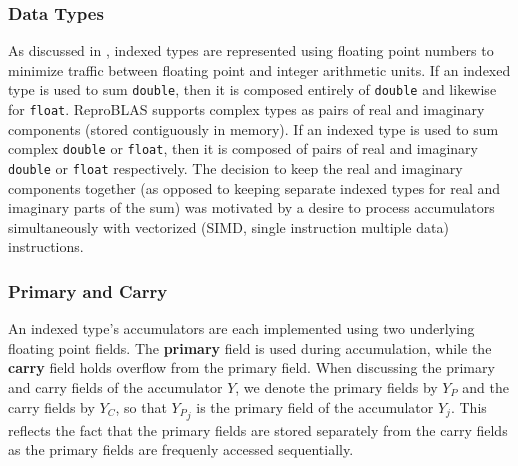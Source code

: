 \documentclass[12pt]{article}
\theoremstyle{plain}
\begin{document}
    \subsubsection{Data Types}
      As discussed in \cite{repsum}, indexed types are represented using floating point numbers to minimize traffic between floating point and integer arithmetic units. If an indexed type is used to sum \verb|double|, then it is composed entirely of \verb|double| and likewise for \verb|float|. ReproBLAS supports complex types as pairs of real and imaginary components (stored contiguously in memory). If an indexed type is used to sum complex \verb|double| or \verb|float|, then it is composed of pairs of real and imaginary \verb|double| or \verb|float| respectively. The decision to keep the real and imaginary components together (as opposed to keeping separate indexed types for real and imaginary parts of the sum) was motivated by a desire to process accumulators simultaneously with vectorized (SIMD, single instruction multiple data) instructions.

    \subsubsection{Primary and Carry}
      An indexed type's accumulators are each implemented using two underlying floating point fields. The \textbf{primary} field is used during accumulation, while the \textbf{carry} field holds overflow from the primary field. When discussing the primary and carry fields of the accumulator $Y$, we denote the primary fields by $Y_P$ and the carry fields by $Y_C$, so that ${Y_P}_j$ is the primary field of the accumulator $Y_j$. This reflects the fact that the primary fields are stored separately from the carry fields as the primary fields are frequenly accessed sequentially.
\end{document}
